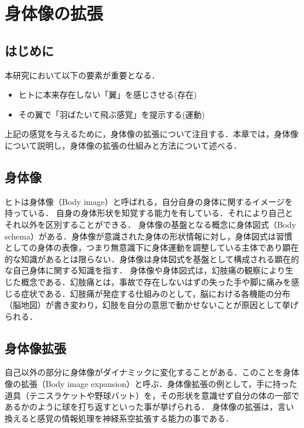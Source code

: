 \chapter[身体像の拡張]%
        {身体像の拡張}

\section{はじめに}
    本研究において以下の要素が重要となる．
    \begin{itemize}
        \item ヒトに本来存在しない「翼」を感じさせる(存在)
        \item その翼で「羽ばたいて飛ぶ感覚」を提示する(運動)
    \end{itemize}
    上記の感覚を与えるために，身体像の拡張について注目する．本章では，身体像について説明し，身体像の拡張の仕組みと方法について述べる．

\section{身体像}
    ヒトは身体像（Body image）\cite{head1911sensory}と呼ばれる，自分自身の身体に関するイメージを持っている．
    自身の身体形状を知覚する能力を有している．それにより自己とそれ以外を区別することができる．
    身体像の基盤となる概念に身体図式（Body schema）がある．身体像が意識された身体の形状情報に対し，身体図式は習慣としての身体の表像，つまり無意識下に身体運動を調整している主体であり顕在的な知識があるとは限らない．身体像は身体図式を基盤として構成される顕在的な自己身体に関する知識を指す\cite{nishida-bodyimage}．
    身体像や身体図式は，幻肢痛\cite{Ramachandran}の観察により生じた概念である．幻肢痛とは，事故で存在しないはずの失った手や脚に痛みを感じる症状である．幻肢痛が発症する仕組みのとして，脳における各機能の分布（脳地図\cite{池谷裕二2007進化しすぎた脳}）が書き変わり，幻肢を自分の意思で動かせないことが原因として挙げられる．

\section{身体像拡張}
    自己以外の部分に身体像がダイナミックに変化することがある．このことを身体像の拡張（Body image expansion）と呼ぶ．身体像拡張の例として，手に持った道具（テニスラケットや野球バット）を，その形状を意識せず自分の体の一部であるかのように球を打ち返すといった事が挙げられる\cite{渡辺貴文2005仮想道具による身体像拡張の評価手法に関する研究}．
    身体像の拡張は，言い換えると感覚の情報処理を神経系空拡張する能力の事である．

